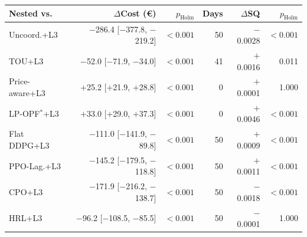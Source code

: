 \begin{tabular}{@{}lrrrrr@{}}
\toprule
Nested vs. & $\Delta$Cost (\euro) & $p_{\mathrm{Holm}}$ & Days & $\Delta$SQ & $p_{\mathrm{Holm}}$ \\
\midrule
Uncoord.+L3 & $-$286.4 {\scriptsize[$-$377.8, $-$219.2]} & $<\!0.001$ & 50 & $-$0.0028 & $<\!0.001$ \\
TOU+L3 & $-$52.0 {\scriptsize[$-$71.9, $-$34.0]} & $<\!0.001$ & 41 & $+$0.0016 & 0.011 \\
Price-aware+L3 & $+$25.2 {\scriptsize[$+$21.9, $+$28.8]} & $<\!0.001$ & 0 & $+$0.0001 & 1.000 \\
LP-OPF$^\ast$+L3 & $+$33.0 {\scriptsize[$+$29.0, $+$37.3]} & $<\!0.001$ & 0 & $+$0.0046 & $<\!0.001$ \\
Flat DDPG+L3 & $-$111.0 {\scriptsize[$-$141.9, $-$89.8]} & $<\!0.001$ & 50 & $+$0.0009 & $<\!0.001$ \\
PPO-Lag.+L3 & $-$145.2 {\scriptsize[$-$179.5, $-$118.8]} & $<\!0.001$ & 50 & $+$0.0011 & $<\!0.001$ \\
CPO+L3 & $-$171.9 {\scriptsize[$-$216.2, $-$138.7]} & $<\!0.001$ & 50 & $-$0.0018 & $<\!0.001$ \\
HRL+L3 & $-$96.2 {\scriptsize[$-$108.5, $-$85.5]} & $<\!0.001$ & 50 & $-$0.0001 & 1.000 \\
\bottomrule
\end{tabular}
